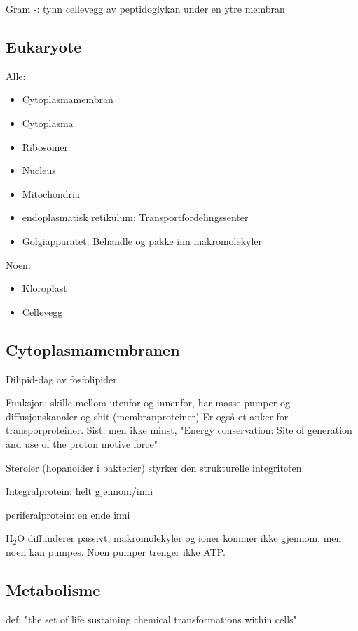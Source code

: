     Gram -: tynn cellevegg av peptidoglykan under en ytre membran 

\subsection{Eukaryote}
    Alle: 
    \begin{itemize}
        \item Cytoplasmamembran
        \item Cytoplasma
        \item Ribosomer
        \item Nucleus
        \item Mitochondria
        \item endoplasmatisk retikulum: Transportfordelingssenter
        \item Golgiapparatet: Behandle og pakke inn makromolekyler
    \end{itemize}

    Noen: 
    \begin{itemize}
        \item Kloroplast
        \item Cellevegg
    \end{itemize}

\subsection{Cytoplasmamembranen}
    Dilipid-dag av fosfolipider

    Funksjon: skille mellom utenfor og innenfor, har masse pumper og diffusjonskanaler og shit (membranproteiner)
    Er også et anker for transporproteiner. Sist, men ikke minst, "Energy conservation: Site of generation and use of the proton motive force"

    Steroler (hopanoider i bakterier) styrker den strukturelle integriteten.

    Integralprotein: helt gjennom/inni

    periferalprotein: en ende inni

    H$_2$O diffunderer passivt, makromolekyler og ioner kommer ikke gjennom, men noen kan pumpes. Noen pumper trenger ikke ATP.

\subsection{Metabolisme}
    def: "the set of life sustaining chemical transformations within cells"

